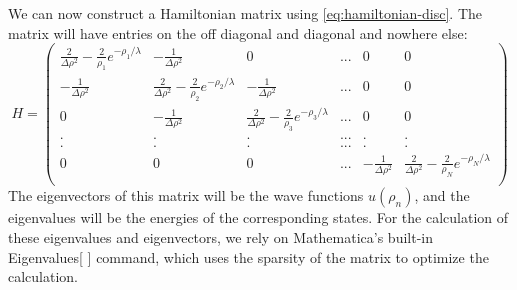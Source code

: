 \documentclass[12pt,twoside]{reedthesis}
\begin{document}
We can now construct a Hamiltonian matrix using \eqref{eq:hamiltonian-disc}. The matrix will have entries on the off diagonal and diagonal and nowhere else:
\begin{equation*}H = \left(
\begin{array}{cccccc}
\frac{2} {\Delta \rho^2} -  \frac{2}{\rho_1}e^{-\rho_1/\lambda} & -\frac{1}{\Delta \rho^2} &  0 & ... & 0 & 0 \\
-\frac{1}{\Delta \rho^2} & \frac{2} {\Delta \rho^2} -  \frac{2}{\rho_2}e^{-\rho_2/\lambda} &  -\frac{1}{\Delta \rho^2}  & ... & 0 & 0 \\
0 &  -\frac{1}{\Delta \rho^2} & \frac{2} {\Delta \rho^2} -  \frac{2}{\rho_3}e^{-\rho_3/\lambda} &  ...  & 0 & 0 \\
 .&  . &.  &... & .& .  \\
 .& . & . & ...& .&  . \\
0 & 0 &  0 & ...&  -\frac{1}{\Delta \rho^2} & \frac{2} {\Delta \rho^2} -  \frac{2}{\rho_N}e^{-\rho_N/\lambda}   \\
\end{array}
\right)
\end{equation*}
The eigenvectors of this matrix will be the wave functions $u(\rho_n)$, and the eigenvalues will be the energies of the corresponding states. For the calculation of these eigenvalues and eigenvectors, we rely on Mathematica's built-in Eigenvalues[ ] command, which uses the sparsity of the matrix to optimize the calculation. 
\end{document}
